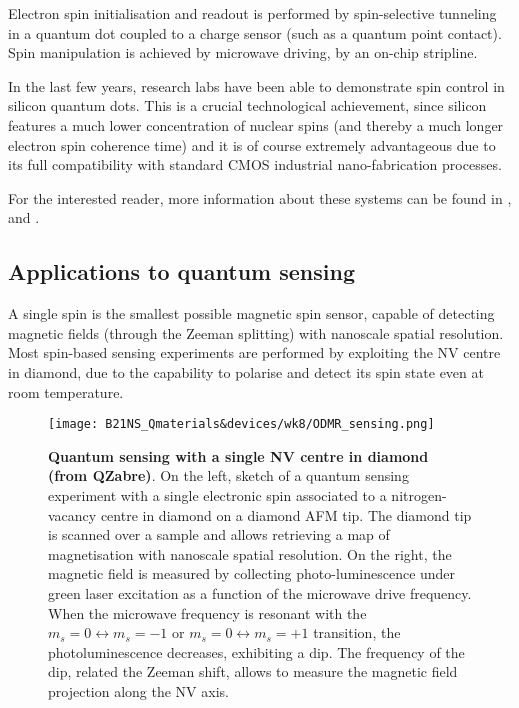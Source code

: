 \documentclass[a4paper,11pt]{article}
\begin{document}
Electron spin initialisation and readout is performed by spin-selective tunneling in a quantum dot coupled to a charge sensor (such as a quantum point contact). Spin manipulation is achieved by microwave driving, by an on-chip stripline.

In the last few years, research labs have been able to demonstrate spin control in silicon quantum dots. This is a crucial technological achievement, since silicon features a much lower concentration of nuclear spins (and thereby a much longer electron spin coherence time) and it is of course extremely advantageous due to its full compatibility with standard CMOS industrial nano-fabrication processes.

For the interested reader, more information about these systems can be found in \cite{hanson_spins_2007}, \cite{morton_embracing_2011} and \cite{zwanenburg_silicon_2013}.


\subsection {Applications to quantum sensing}
A single spin is the smallest possible magnetic spin sensor, capable of detecting magnetic fields (through the Zeeman splitting) with nanoscale spatial resolution. Most spin-based sensing experiments are performed by exploiting the NV centre in diamond, due to the capability to polarise and detect its spin state even at room temperature.

\begin{figure}[h]
\centering
\texttt{[image: B21NS\_Qmaterials\&devices/wk8/ODMR\_sensing.png]}
\caption{{\bf Quantum sensing with a single NV centre in diamond (from QZabre)}. On the left, sketch of a quantum sensing experiment with a single electronic spin associated to a nitrogen-vacancy centre in diamond on a diamond AFM tip. The diamond tip is scanned over a sample and allows retrieving a map of magnetisation with nanoscale spatial resolution. On the right, the magnetic field is measured by collecting photo-luminescence under green laser excitation as a function of the microwave drive frequency. When the microwave frequency is resonant with the $m_s = 0 \leftrightarrow m_s = -1$ or $m_s = 0 \leftrightarrow m_s = +1$ transition, the photoluminescence decreases, exhibiting a dip. The frequency of the dip, related the Zeeman shift, allows to measure the magnetic field projection along the NV axis.}
\label{fig:ODMR_sensing}
\end{figure}
\end{document}
